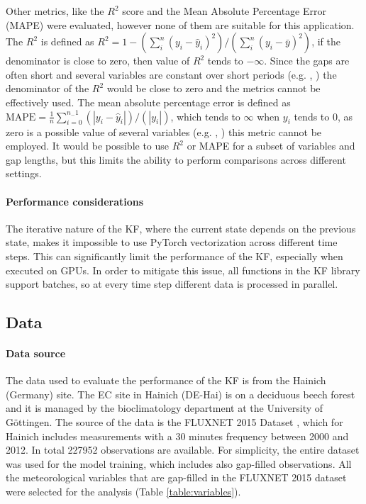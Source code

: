 \documentclass{article}
\let\Oldsubsection\subsection
\renewcommand{\subsection}{\FloatBarrier\Oldsubsection}
\begin{document}
Other metrics, like the $R^2$ score and the Mean Absolute Percentage Error (MAPE) were evaluated, however none of them are suitable for this application. The $R^2$ is defined as $R^2 = 1 - (\sum_{i}^{n} (y_i - \hat{y}_i)^2)/(\sum_{i}^{n} (y_i - \bar{y})^2)$, if the denominator is close to zero, then value of $R^2$ tends to $- \infty$. Since the gaps are often short and several variables are constant over short periods (e.g. , ) the denominator of the $R^2$ would be close to zero and the metrics cannot be effectively used. The mean absolute percentage error is defined as $\text{MAPE} = \frac{1}{n} \sum_{i=0}^{n_-1} (\left| y_i - \hat{y}_i \right|)/(\left| y_i \right|)$, which tends to $\infty$ when $y_i$ tends to 0, as zero is a possible value of several variables (e.g. , ) this metric cannot be employed.
It would be possible to use $R^2$ or MAPE for a subset of variables and gap lengths, but this limits the ability to perform comparisons across different settings.

\paragraph{Performance considerations}

The iterative nature of the KF, where the current state depends on the previous state, makes it impossible to use \textsf{PyTorch} vectorization across different time steps. This can significantly limit the performance of the KF, especially when executed on GPUs. In order to  mitigate this issue, all functions in the KF library support batches, so at every time step different data is processed in parallel.


\subsection{Data}

\paragraph{Data source} The data used to evaluate the performance of the KF is from the Hainich (Germany) site. The EC site in Hainich (DE-Hai) is on a deciduous beech forest and it is managed by the bioclimatology department at the  University of Göttingen. The source of the data is  the FLUXNET 2015 Dataset \cite{pastorello_fluxnet2015_2020}, which for Hainich includes measurements with a 30 minutes frequency between 2000 and 2012. In total 227952 observations are available. For simplicity, the entire dataset was used for the model training, which includes also gap-filled observations.
All the meteorological variables that are gap-filled in the FLUXNET 2015 dataset were selected for the analysis (Table \ref{table:variables}).
\end{document}
